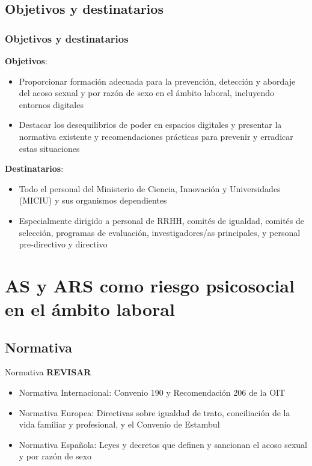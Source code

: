 \documentclass{beamer}
\begin{document}
    \subsection{Objetivos y destinatarios}
    \begin{frame}
        \frametitle{Objetivos y destinatarios}
        \textbf{Objetivos}:
        \begin{itemize}
            \item Proporcionar formación adecuada para la prevención, detección y abordaje del acoso sexual y por razón de sexo en el ámbito laboral, incluyendo entornos digitales
            \item Destacar los desequilibrios de poder en espacios digitales y presentar la normativa existente y recomendaciones prácticas para prevenir y erradicar estas situaciones
        \end{itemize}
        \textbf{Destinatarios}:
        \begin{itemize}
            \item Todo el personal del Ministerio de Ciencia, Innovación y Universidades (MICIU) y sus organismos dependientes
            \item Especialmente dirigido a personal de RRHH, comités de igualdad, comités de selección, programas de evaluación, investigadores/as principales, y personal pre-directivo y directivo
        \end{itemize}
    \end{frame}


    \section{AS y ARS como riesgo psicosocial en el ámbito laboral}

    \subsection{Normativa}
    \begin{frame}{Normativa}
        \textbf{REVISAR}
        \begin{itemize}
            \item Normativa Internacional: Convenio 190 y Recomendación 206 de la OIT
            \item Normativa Europea: Directivas sobre igualdad de trato, conciliación de la vida familiar y profesional, y el Convenio de Estambul
            \item Normativa Española: Leyes y decretos que definen y sancionan el acoso sexual y por razón de sexo
        \end{itemize}
    \end{frame}
\end{document}
